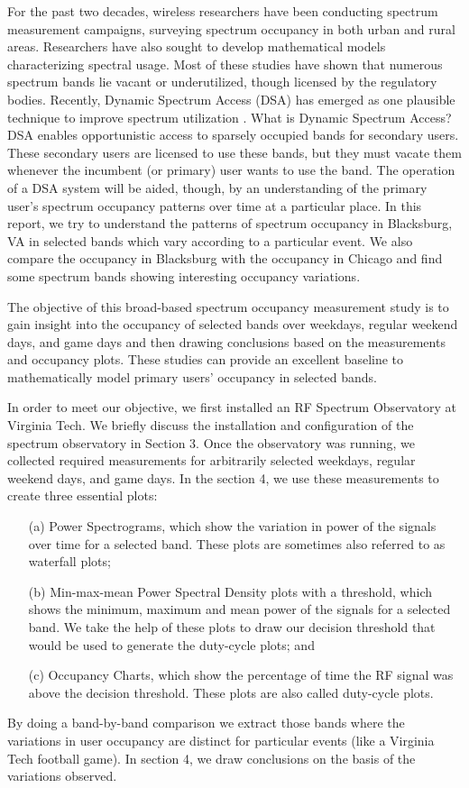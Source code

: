\documentclass[12pt,sts]{report}
\begin{document}
For the past two decades, wireless researchers have been conducting spectrum measurement campaigns, surveying spectrum occupancy in both urban and rural areas. Researchers have also sought to develop mathematical models characterizing spectral usage. Most of these studies have shown that numerous spectrum bands lie vacant or underutilized, though licensed by the regulatory bodies. Recently, Dynamic Spectrum Access (DSA) has emerged as one plausible technique to improve spectrum utilization \cite{Akyildiz06nextgeneration/dynamic}. What is Dynamic Spectrum Access? DSA enables opportunistic access to sparsely occupied bands for secondary users. These secondary users are licensed to use these bands, but they must vacate them whenever the incumbent (or primary) user wants to use the band. The operation of a DSA system will be aided, though, by an understanding of the primary user's spectrum occupancy patterns over time at a particular place. In this report, we try to understand the patterns of spectrum occupancy in Blacksburg, VA in selected bands which vary according to a particular event. We also compare the occupancy in Blacksburg with the occupancy in Chicago and find some spectrum bands showing interesting occupancy variations.

	The objective of this broad-based spectrum occupancy measurement study is to gain insight into the occupancy of selected bands over weekdays, regular weekend days, and game days and then drawing conclusions based on the measurements and occupancy plots. These studies can provide an excellent baseline to mathematically model primary users' occupancy in selected bands.
	
	In order to meet our objective, we first installed an RF Spectrum Observatory at Virginia Tech. We briefly discuss the installation and configuration of the spectrum observatory in Section 3. Once the observatory was running, we collected required measurements for arbitrarily selected weekdays, regular weekend days, and game days. In the section 4, we use these measurements to create three essential plots:
	\begin{enumerate}
		\item[(a)] Power Spectrograms, which show the variation in power of the signals over time for a selected band. These plots are sometimes also referred to as waterfall plots; %
		\item[(b)] Min-max-mean Power Spectral Density plots with a threshold, which shows the minimum, maximum and mean power of the signals for a selected band. We take the help of these plots to draw our decision threshold that would be used to generate the duty-cycle plots; and%
		\item[(c)] Occupancy Charts, which show the percentage of time the RF signal was above the decision threshold. These plots are also called duty-cycle plots. %
	\end{enumerate}
	By doing a band-by-band comparison we extract those bands where the variations in user occupancy are distinct for particular events (like a Virginia Tech football game). In section 4, we draw conclusions on the basis of the variations observed.
\end{document}
